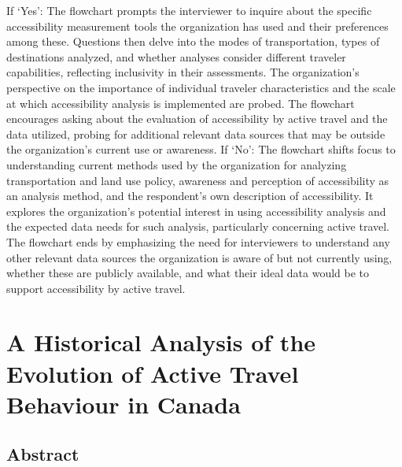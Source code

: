 \documentclass[12pt,twoside]{reedthesis}
\begin{document}
If `Yes':
The flowchart prompts the interviewer to inquire about the specific accessibility measurement tools the organization has used and their preferences among these.
Questions then delve into the modes of transportation, types of destinations analyzed, and whether analyses consider different traveler capabilities, reflecting inclusivity in their assessments.
The organization's perspective on the importance of individual traveler characteristics and the scale at which accessibility analysis is implemented are probed.
The flowchart encourages asking about the evaluation of accessibility by active travel and the data utilized, probing for additional relevant data sources that may be outside the organization's current use or awareness.
If `No':
The flowchart shifts focus to understanding current methods used by the organization for analyzing transportation and land use policy, awareness and perception of accessibility as an analysis method, and the respondent's own description of accessibility.
It explores the organization's potential interest in using accessibility analysis and the expected data needs for such analysis, particularly concerning active travel.
The flowchart ends by emphasizing the need for interviewers to understand any other relevant data sources the organization is aware of but not currently using, whether these are publicly available, and what their ideal data would be to support accessibility by active travel.

\hypertarget{math-sci}{%
\chapter{A Historical Analysis of the Evolution of Active Travel Behaviour in Canada}\label{math-sci}}

\hypertarget{abstract-1}{%
\section{Abstract}\label{abstract-1}}
\end{document}
